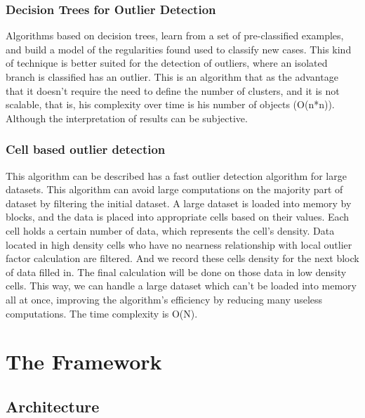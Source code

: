 \documentclass{llncs}
\begin{document}
\subsubsection{Decision Trees for Outlier Detection}
Algorithms based on decision trees, learn from a set of pre-classified examples, and build a model of the regularities found used to classify new cases.
This kind of technique is better suited for the detection of outliers, where an isolated branch is classified has an outlier.
This is an algorithm that as the advantage that it doesn't require the need to define the number of clusters, and it is not scalable, that is, his complexity over time is his number of objects (O(n*n)). Although the interpretation of results can be subjective.

\subsubsection{Cell based outlier detection}
This algorithm can be described has a fast outlier detection algorithm for large datasets. This algorithm can avoid large computations on the majority part of dataset by filtering the initial dataset.
A large dataset is loaded into memory by blocks, and the data is placed into appropriate cells based on their values. Each cell holds a certain number of data, which represents the cell's density. Data located in high density cells who have no nearness relationship with local outlier factor calculation are filtered. And we record these cells density for the next block of data filled in. The final calculation will be done on those data in low density cells. This way, we can handle a large dataset which can't be loaded into memory all at once, improving the algorithm's efficiency by reducing many useless computations. The time complexity is O(N).


\section{The Framework}

\subsection{Architecture}
\end{document}
